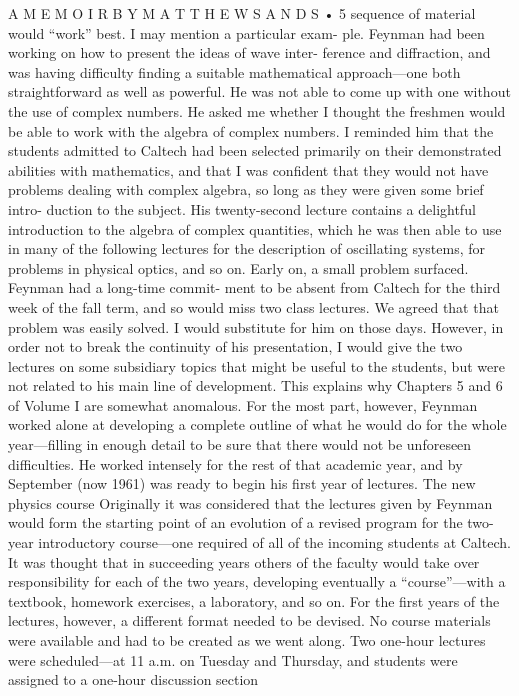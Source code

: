 \documentclass[11pt,oneside]{article}
\begin{document}
A  M E M O I R  B Y  M A T T H E W  S A N D S • 5 sequence of material would “work” best. I may mention a particular exam- ple. Feynman had been working on how to present the ideas of wave inter- ference and diffraction, and was having difficulty finding a suitable mathematical approach---one both straightforward as well as powerful. He was not able to come up with one without the use of complex numbers. He asked me whether I thought the freshmen would be able to work with the algebra of complex numbers. I reminded him that the students admitted to Caltech had been selected primarily on their demonstrated abilities with mathematics, and that I was confident that they would not have problems dealing with complex algebra, so long as they were given some brief intro- duction to the subject. His twenty-second lecture contains a delightful introduction to the algebra of complex quantities, which he was then able to use in many of the following lectures for the description of oscillating systems, for problems in physical optics, and so on. Early on, a small problem surfaced. Feynman had a long-time commit- ment to be absent from Caltech for the third week of the fall term, and so would miss two class lectures. We agreed that that problem was easily solved. I would substitute for him on those days. However, in order not to break the continuity of his presentation, I would give the two lectures on some subsidiary topics that might be useful to the students, but were not related to his main line of development. This explains why Chapters 5 and 6 of Volume I are somewhat anomalous. For the most part, however, Feynman worked alone at developing a complete outline of what he would do for the whole year---filling in enough detail to be sure that there would not be unforeseen difficulties. He worked intensely for the rest of that academic year, and by September (now 1961) was ready to begin his first year of lectures. The new physics course Originally it was considered that the lectures given by Feynman would form the starting point of an evolution of a revised program for the two- year introductory course---one required of all of the incoming students at Caltech. It was thought that in succeeding years others of the faculty would take over responsibility for each of the two years, developing eventually a “course”---with a textbook, homework exercises, a laboratory, and so on. For the first years of the lectures, however, a different format needed to be devised. No course materials were available and had to be created as we went along. Two one-hour lectures were scheduled---at 11 a.m. on Tuesday and Thursday, and students were assigned to a one-hour discussion section\par
\end{document}

